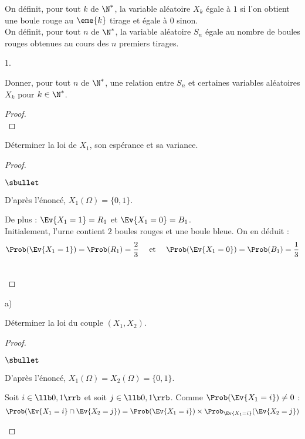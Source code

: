 \noindent 
On définit, pour tout $k$ de $\N^*$, la variable aléatoire $X_k$ égale
à $1$ si l'on obtient une boule rouge au $\eme{k}$ tirage et égale à
$0$ sinon.\\
On définit, pour tout $n$ de $\N^*$, la variable aléatoire $S_n$ égale
au nombre de boules rouges obtenues au cours des $n$ premiers tirages.
\begin{noliste}{1.}
  \setcounter{enumi}{4}
\item Donner, pour tout $n$ de $\N^*$, une relation entre $S_n$ et
  certaines variables aléatoires $X_k$ pour $k \in \N^*$.
  
  \begin{proof}~%
    ~\\[-1cm]
  \end{proof}

\item Déterminer la loi de $X_1$, son espérance et sa variance.

  \begin{proof}~
    \begin{noliste}{$\sbullet$}
    \item D'après l'énoncé, $X_1(\Omega) = \{0, 1\}$.
    \item De plus : $\Ev{X_1 = 1} = R_1$ et $\Ev{X_1 = 0} = B_1$.\\
      Initialement, l'urne contient $2$ boules rouges et une boule
      bleue. On en déduit :
      \[
      \Prob(\Ev{X_1 = 1}) = \Prob(R_1) = \dfrac{2}{3} \quad \mbox{ et
      } \quad \Prob(\Ev{X_1 = 0}) = \Prob(B_1) = \dfrac{1}{3}
      \]      
    \end{noliste}
    ~\\[-1cm]
  \end{proof}

\item
  \begin{noliste}{a)}
  \item Déterminer la loi du couple $(X_1, X_2)$.

    \begin{proof}~
      \begin{noliste}{$\sbullet$}
      \item D'après l'énoncé, $X_1(\Omega) = X_2(\Omega) = \{0, 1\}$.
      \item Soit $i \in \llb 0, 1 \rrb$ et soit $j \in \llb 0, 1
        \rrb$. Comme $\Prob(\Ev{X_1 = i}) \neq 0$ :
        \[
        \Prob(\Ev{X_1 = i} \cap \Ev{X_2 = j}) = \Prob(\Ev{X_1 = i})
        \times \Prob_{\Ev{X_1 = i}}(\Ev{X_2 = j})
        \]



\end{noliste}
\end{proof}
\end{noliste}
\end{noliste}
